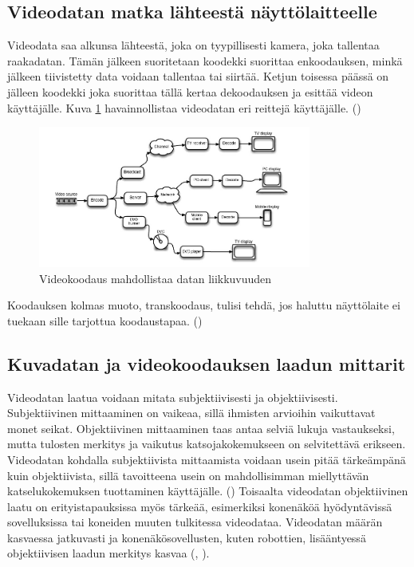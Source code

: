 \subsection{Videodatan matka lähteestä näyttölaitteelle}

Videodata saa alkunsa lähteestä, joka on tyypillisesti kamera, joka tallentaa
raakadatan. Tämän jälkeen suoritetaan koodekki suorittaa enkoodauksen, minkä
jälkeen tiivistetty data voidaan tallentaa tai siirtää. Ketjun toisessa
päässä on jälleen koodekki joka suorittaa tällä kertaa dekoodauksen ja esittää
videon käyttäjälle. Kuva \ref{fig:codec} havainnollistaa videodatan eri reittejä
käyttäjälle. (\citealt{h264})

\begin{figure}[ht]
	\centering
	\includegraphics[width=0.8\textwidth]{codec.jpg}
	\caption{Videokoodaus mahdollistaa datan liikkuvuuden}
	\label{fig:codec}
\end{figure}

Koodauksen kolmas muoto, transkoodaus, tulisi tehdä, jos haluttu näyttölaite ei
tuekaan sille tarjottua koodaustapaa. (\citealt{mpeg_app})

\subsection{Kuvadatan ja videokoodauksen laadun mittarit}
\label{sec:quality}

Videodatan laatua voidaan mitata subjektiivisesti ja objektiivisesti.
Subjektiivinen mittaaminen on vaikeaa, sillä ihmisten arvioihin vaikuttavat
monet seikat. Objektiivinen mittaaminen taas antaa selviä lukuja vastaukseksi,
mutta tulosten merkitys ja vaikutus katsojakokemukseen on selvitettävä erikseen.
Videodatan kohdalla subjektiivista mittaamista voidaan usein pitää tärkeämpänä
kuin objektiivista, sillä tavoitteena usein on mahdollisimman miellyttävän
katselukokemuksen tuottaminen käyttäjälle. (\citealt{h264}) Toisaalta videodatan objektiivinen
laatu on erityistapauksissa myös tärkeää, esimerkiksi konenäköä hyödyntävissä
sovelluksissa tai koneiden muuten tulkitessa videodataa. Videodatan määrän
kasvaessa jatkuvasti ja konenäkösovellusten, kuten robottien, lisääntyessä
objektiivisen laadun merkitys kasvaa (\citealt{youtube}, \citealt{cisco}).

